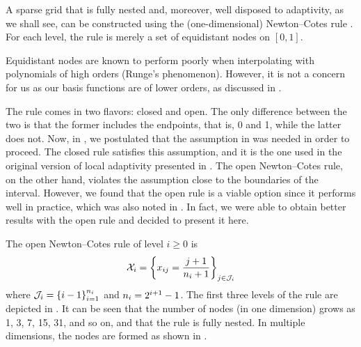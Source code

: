 A sparse grid that is fully nested and, moreover, well disposed to adaptivity,
as we shall see, can be constructed using the (one-dimensional) Newton--Cotes
rule \cite{ma2009}. For each level, the rule is merely a set of equidistant
nodes on $[0, 1]$.

\begin{remark}
Equidistant nodes are known to perform poorly when interpolating with
polynomials of high orders (Runge's phenomenon). However, it is not a concern
for us as our basis functions are of lower orders, as discussed in .
\end{remark}

The rule comes in two flavors: closed and open. The only difference between the
two is that the former includes the endpoints, that is, 0 and 1, while the
latter does not. Now, in , we postulated that the assumption in
 was needed in order to proceed. The closed rule
satisfies this assumption, and it is the one used in the original version of
local adaptivity presented in \cite{ma2009}. The open Newton--Cotes rule, on the
other hand, violates the assumption close to the boundaries of the interval.
However, we found that the open rule is a viable option since it performs well
in practice, which was also noted in \cite{klimke2006}. In fact, we were able to
obtain better results with the open rule and decided to present it here.

The open Newton--Cotes rule of level $i \geq 0$ is
\begin{equation} \elab{newton-cotes-grid}
  \X_i = \left\{ x_{ij} = \frac{j + 1}{\n_i + 1} \right\}_{j \in \oindex_i}
\end{equation}
where $\mathcal{J}_i = \left\{ i - 1 \right\}_{i = 1}^{n_i}$ and $n_i = 2^{i + 1}
- 1$. The first three levels of the rule are depicted in . It can be
seen that the number of nodes (in one dimension) grows as 1, 3, 7, 15, 31, and
so on, and that the rule is fully nested. In multiple dimensions, the nodes are
formed as shown in .
